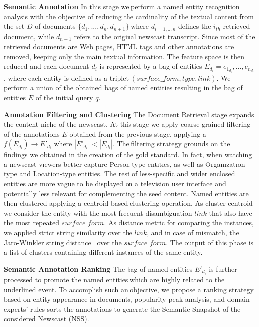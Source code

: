 \documentclass{llncs}
\begin{document}
{\bf Semantic Annotation} In this stage we perform a named entity recognition analysis with the objective of reducing the cardinality of the textual content from the set $D$ of documents $\{d_1, ..., d_n, d_{n+1}\}$ where $d_{i=1,..,n}$ defines the $i_{th}$ retrieved document, while $d_{n+1}$ refers to the original newscast transcript. Since most of the retrieved documents are Web pages, HTML tags and other annotations are removed, keeping only the main textual information. The feature space is then reduced and each document $d_i$ is represented by a bag of entities $E_{d_i}={e_{1_{d_i}}, ..., e_{n_{d_i}}}$, where each entity is defined as a triplet $(surface\_form, type, link)$. We perform a union of the obtained bags of named entities resulting in the bag of entities $E$ of the initial query $q$. 

{\bf Annotation Filtering and Clustering} The Document Retrieval stage expands the content niche of the newscast. At this stage we apply coarse-grained filtering of the annotations $E$ obtained from the previous stage, applying a $f\left ( E_{d_i}\right )\rightarrow  E'_{d_i}$ where $\left |E'_{d_i}  \right | < \left |E_{d_i}  \right |$. The filtering strategy grounds on the findings we obtained in the creation of the gold standard. In fact, when watching a newscast viewers better capture Person-type entities, as well as Organization-type and Location-type entities. The rest of less-specific and wider enclosed entities are more vague to be displayed on a television user interface and potentially less relevant for complementing the seed content. 
Named entities are then clustered applying a centroid-based clustering operation. As cluster centroid we consider the entity with the most frequent disambiguation $link$ that also have the most repeated $surface\_form$. As distance metric for comparing the instances, we applied strict string similarity over the $link$, and in case of mismatch, the Jaro-Winkler string distance~\cite{winkler2006overview} over the $surface\_form$. The output of this phase is a list of clusters containing different instances of the same entity.

{\bf Semantic Annotation Ranking}
The bag of named entities $E'_{d_i}$ is further processed to promote the named entities which are highly related to the underlined event. To accomplish such an objective, we propose a ranking strategy based on entity appearance in documents, popularity peak analysis, and domain experts' rules sorts the annotations to generate the Semantic Snapshot of the considered Newscast (NSS).
\end{document}
